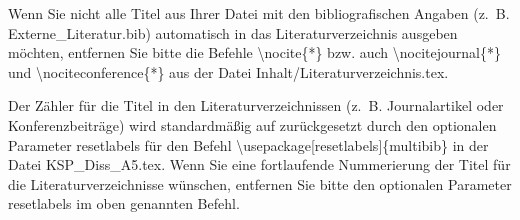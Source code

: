 Wenn Sie nicht alle Titel aus Ihrer Datei mit den bibliografischen Angaben (z.~B. \glqq Externe\_Literatur.bib\grqq{}) automatisch in das Literaturverzeichnis ausgeben möchten, entfernen Sie bitte die Befehle \glqq \textbackslash nocite\{*\}\grqq{} bzw. auch \glqq \textbackslash nocitejournal\{*\}\grqq{}  und \glqq \textbackslash nociteconference\{*\}\grqq{}  aus der Datei \glqq Inhalt/Literaturverzeichnis.tex\grqq{}.

Der Zähler für die Titel in den Literaturverzeichnissen (z.~B. \glqq Journalartikel\grqq{} oder \glqq Konferenzbeiträge\grqq{}) wird standardmäßig auf \glqq [1]\grqq{} zurückgesetzt durch den optionalen Parameter \glqq resetlabels\grqq{} für den Befehl \glqq \textbackslash usepackage[resetlabels]\{multi\-bib\}\grqq{} in der Datei \glqq KSP\_Diss\_A5.tex\grqq{}. Wenn Sie eine fortlaufende Nummerierung der Titel für die Literaturverzeichnisse wünschen, entfernen Sie bitte den optionalen Parameter \glqq resetlabels\grqq{} im oben genannten Befehl.
